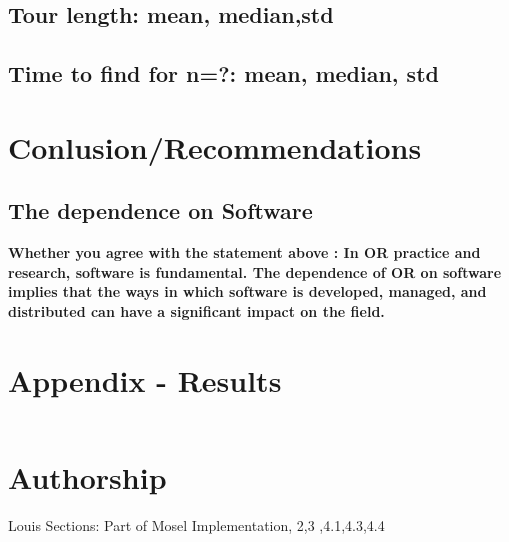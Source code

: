 \documentclass[a4paper,11pt]{article}
\begin{document}
\subsection{Tour length: mean, median,std}

\subsection{Time to find for n=?: mean, median, std}

\section{Conlusion/Recommendations}

\subsection{The dependence on Software}
\textbf{Whether you agree with the statement above : In OR practice and research, software is fundamental. The dependence
of OR on software implies that the ways in which software is developed, managed, and distributed can
have a significant impact on the field.}



























\clearpage
\section*{Appendix - Results}

\begin{lstlisting}

\end{lstlisting}

\section*{Authorship}

Louis Sections: Part of Mosel Implementation, 2,3 ,4.1,4.3,4.4



\clearpage


\end{document}

